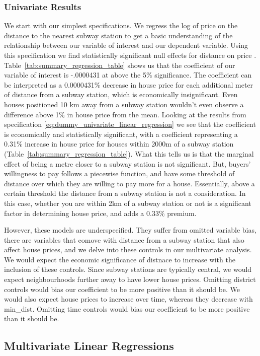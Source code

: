 \subsubsection{Univariate Results}
We start with our simplest specifications. We regress the log of price on the distance to the nearest subway station to get a basic understanding of the 
relationship between our variable of interest and our dependent variable. 
Using this specification we find statistically significant null effects for distance on price . 
Table~\ref{tab:summary_regression_table} shows us that the coefficient of our variable of interest is -.0000431 at above the 5\% significance.
The coefficient can be interpreted as a 0.0000431\% decrease in house price for each additional meter of distance from a subway station, which is economically insignificant.
 Even houses positioned 10 km away from a subway station wouldn't even observe a difference above 1\% in house price from the mean.
Looking at the results from specification \ref{eq:dummy_univariate_linear_regression} we see that the coefficient is economically and statistically significant,
with a coefficient representing a 0.31\% increase in house price for houses within 2000m of a subway station (Table~\ref{tab:summary_regression_table}).
What this tells us is that the marginal effect of being a metre closer to a subway station is not significant. But, buyers' willingness to pay follows a piecewise function, and have some threshold of distance over which
they are willing to pay more for a house. Essentially, above a certain threshold the distance from a subway station is not a consideration.
In this case, whether you are within 2km of a subway station or not is a significant factor in determining house price, and adds a 0.33\% premium.

However, these models are underspecified. They suffer from omitted variable bias, there are variables that comove with distance from a subway station that also affect house prices, and we delve into these
controls in our multivariate analysis. We would expect the economic significance of distnace to increase with the inclusion of these controls.
Since subway stations are typically central, we would expect neighbourhoods further away to have lower house prices. Omitting 
district controls would bias our coefficient to be more positive than it should be. We would also expect house prices to increase over time, whereas they decrease with min\_dist. Omitting time controls would bias our coefficient to be more 
positive than it should be.
\subsection{Multivariate Linear Regressions}

